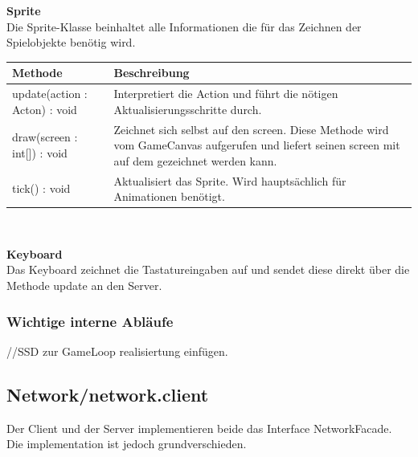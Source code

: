 \documentclass[11pt]{scrartcl}
\begin{document}
\textbf{Sprite}\\
Die Sprite-Klasse beinhaltet alle Informationen die für das Zeichnen der Spielobjekte benötig wird.\\
\begin{table}
\begin{tabularx}{\linewidth}{l X}
\textbf{Methode} & \textbf{Beschreibung}\\
\hline
update(action : Acton) : void & Interpretiert die Action und führt die nötigen Aktualisierungsschritte durch.\\
draw(screen : int[]) : void & Zeichnet sich selbst auf den screen. Diese Methode wird vom GameCanvas aufgerufen und liefert seinen screen mit auf dem gezeichnet werden kann.\\
tick() : void & Aktualisiert das Sprite. Wird hauptsächlich für Animationen benötigt.\\
\end{tabularx}\\
\end{table}
\textbf{Keyboard}\\
Das Keyboard zeichnet die Tastatureingaben auf und sendet diese direkt über die Methode update an den Server.

\subsubsection{Wichtige interne Abläufe}
//SSD zur GameLoop realisiertung einfügen.


\newpage

\subsection{Network/network.client}

Der Client und der Server implementieren beide das Interface NetworkFacade. Die implementation ist jedoch grundverschieden.
\end{document}
